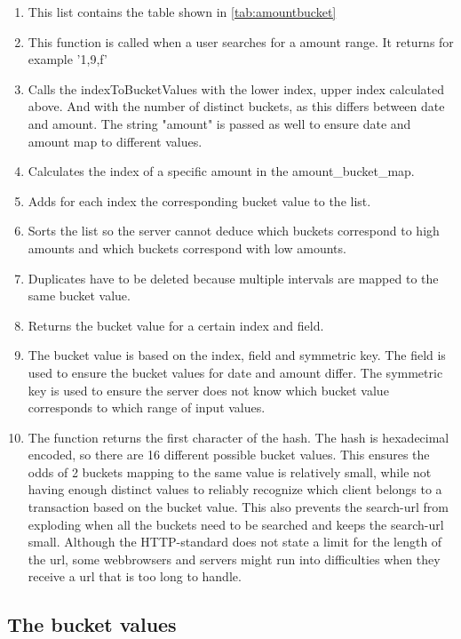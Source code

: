 \documentclass[a4paper]{article}
\begin{document}
\begin{enumerate}
	\item This list contains the table shown in \ref{tab:amountbucket}
    \item This function is called when a user searches for a amount range. It returns for example '1,9,f'
    \item Calls the indexToBucketValues with the lower index, upper index calculated above. And with the number of distinct buckets, as this differs between date and amount. The string "amount" is passed as well to ensure date and amount map to different values.
    \item Calculates the index of a specific amount in the amount\_bucket\_map.
    \item Adds for each index the corresponding bucket value to the list. 
    \item Sorts the list so the server cannot deduce which buckets correspond to high amounts and which buckets correspond with low amounts.
    \item Duplicates have to be deleted because multiple intervals are mapped to the same bucket value.
    \item Returns the bucket value for a certain index and field.
    \item The bucket value is based on the index, field and symmetric key. The field is used to ensure the bucket values for date and amount differ. The symmetric key is used to ensure the server does not know which bucket value corresponds to which range of input values.
    \item The function returns the first character of the hash. The hash is hexadecimal encoded, so there are 16 different possible bucket values. This ensures the odds of 2 buckets mapping to the same value is relatively small, while not having enough distinct values to reliably recognize which client belongs to a transaction based on the bucket value. This also prevents the search-url from exploding when all the buckets need to be searched and keeps the search-url small. Although the HTTP-standard does not state a limit for the length of the url, some webbrowsers and servers might run into difficulties when they receive a url that is too long to handle.  
\end{enumerate}
    
    \subsection{The bucket values}\label{sec:bucket}
    	
\end{document}
